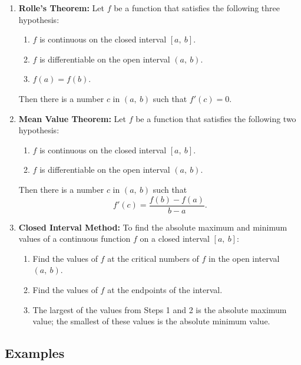 \documentclass[12pt,addpoints, answers, fleqn]{exam}
\begin{document}
\begin{enumerate}
\item \textbf{Rolle's Theorem:} Let $f$ be a function that satisfies the following three hypothesis:
\begin{enumerate}
\item $f$ is continuous on the closed interval $\left[ a, \ b \right]$.
\item $f$ is differentiable on the open interval $\left( a, \ b \right)$.
\item $f\left( a \right) = f \left( b \right)$.
\end{enumerate}
Then there is a number $c$ in $\left( a, \ b \right)$ such that $f'\left( c \right) = 0$.
\item \textbf{Mean Value Theorem:} Let $f$ be a function that satisfies the following two hypothesis:
\begin{enumerate}
\item $f$ is continuous on the closed interval $\left[ a, \ b \right]$.
\item $f$ is differentiable on the open interval $\left( a, \ b \right)$.
\end{enumerate}
Then there is a number $c$ in $\left( a, \ b \right)$ such that
\[
f'\left( c \right) = \frac{f\left(b\right) - f\left(a\right)}{b-a}.
\]
\item \textbf{Closed Interval Method:} To find the absolute maximum and minimum values of a continuous function $f$ on a closed interval $\left[ a, \ b \right]$:
\begin{enumerate}
\item Find the values of $f$ at the critical numbers of $f$ in the open interval $\left( a, \ b \right)$.
\item Find the values of $f$ at the endpoints of the interval.
\item The largest of the values from Steps 1 and 2 is the absolute maximum value; the smallest of these values is the absolute minimum value.
\end{enumerate}
\end{enumerate}









\subsection{Examples}
\end{document}
